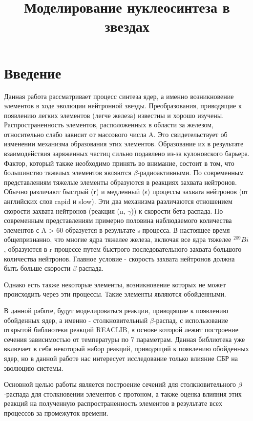 \documentclass[%
master,    %
natbib,      %
subf,        %
href,        %
colorlinks,  %
]{disser}
\begin{document}
\title{Моделирование нуклеосинтеза в звездах}
\maketitle
\tableofcontents
\section*{\centering Введение}
Данная работа рассматривает процесс синтеза ядер, а именно возникновение элементов в ходе эволюции нейтронной звезды. Преобразования, приводящие к появлению легких элементов (легче железа) известны и хорошо изучены. Распространенность элементов, расположенных в области за железом, относительно слабо зависит от массового числа A. Это свидетельствует об изменении механизма образования этих элементов.  Образование их в результате взаимодействия заряженных частиц сильно подавлено из-за кулоновского барьера. Фактор, который также необходимо принять во внимание, состоит в том, что большинство тяжелых элементов являются $\beta$-радиоактивными. По современным представлениям тяжелые элементы образуются в реакциях захвата нейтронов. Обычно различают быстрый (r) и медленный (s) процессы захвата нейтронов (от английских слов rapid и slow). Эти два механизма различаются отношением скорости захвата нейтронов (реакция (n, $\gamma$)) к скорости бета-распада. По современным представлениям примерно половина наблюдаемого количества элементов с A > 60 образуется в результате s-процесса. В настоящее время общепризнанно, что многие ядра тяжелее железа, включая все ядра тяжелее $^{209}Bi$, образуются в r-процессе путем быстрого последовательного захвата большого количества нейтронов. Главное условие - скорость захвата нейтронов должна быть больше скорости $\beta$-распада. 

Однако есть также некоторые элементы, возникновение которых не может происходить через эти процессы. Такие элементы являются обойденными. 

В данной работе, будут моделироваться реакции, приводящие к появлению обойденных ядер, а именно - столкновительный $\beta$-распад, с использование открытой библиотеки реакций REACLIB, в основе которой лежит построение сечения зависимостью от температуры по 7 параметрам. Данная библиотека уже включает в себя некоторый набор реакций, приводящий к появлению обойденных ядер, но в данной работе нас интересует исследование только влияние СБР на эволюцию системы. 

Основной целью работы является построение сечений для столкновительного $\beta$-распада для столкновении элементов с протоном, а также оценка влияния этих реакций на полученную распространенность элементов в результате всех процессов за промежуток времени.
\end{document}
